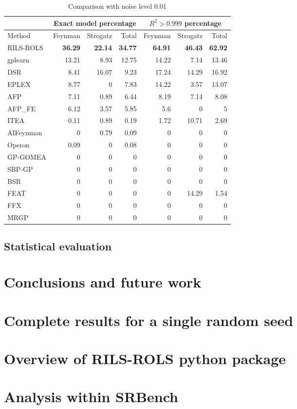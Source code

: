 \documentclass[a4paper,12pt]{elsarticle}
\begin{document}
\begin{table}[!htb]
	\caption{Comparison with noise level 0.01}\label{tab:comp_noise001}
	\centering
	\begin{tabular}{l|rrr|rrr} \hline
		& \multicolumn{3}{c|}{Exact model percentage} & \multicolumn{3}{c}{$R^2 > 0.999$ percentage}\\ \hline
		Method & Feynman & Strogatz & Total & Feynman & Strogatz & Total \\ \hline
		RILS-ROLS&\bf{36.29}&\bf{22.14}&\bf{34.77}&\bf{64.91}&\bf{46.43}&\bf{62.92}\\
		gplearn&13.21&8.93&12.75&14.22&7.14&13.46\\
		DSR&8.41&16.07&9.23&17.24&14.29&16.92\\
		EPLEX&8.77&0&7.83&14.22&3.57&13.07\\
		AFP&7.11&0.89&6.44&8.19&7.14&8.08\\
		AFP\_FE&6.12&3.57&5.85&5.6&0&5\\
		ITEA&0.11&0.89&0.19&1.72&10.71&2.69\\
		AIFeynman&0&0.79&0.09&0&0&0\\
		Operon&0.09&0&0.08&0&0&0\\
		GP-GOMEA&0&0&0&0&0&0\\
		SBP-GP&0&0&0&0&0&0\\
		BSR&0&0&0&0&0&0\\
		FEAT&0&0&0&0&14.29&1.54\\
		FFX&0&0&0&0&0&0\\
		MRGP&0&0&0&0&0&0\\
		\hline
	\end{tabular}
\end{table}

\subsection{Statistical evaluation}

\section{Conclusions and future work}\label{sec:conclusions}
  
 \newpage
 \appendix
 
 \section{Complete results for a single random seed}\label{sec:appendix-1}
 
 \section{Overview of RILS-ROLS python package}\label{sec:appendix-2}
 
 \section{Analysis within SRBench}
  
  
  
 
\newpage
	
	

	
\end{document}
